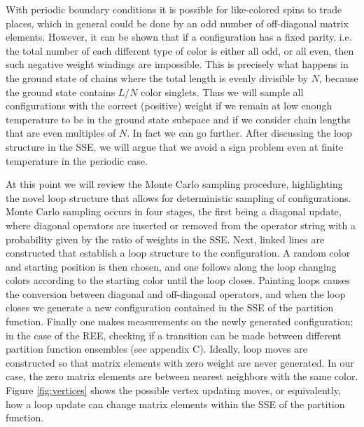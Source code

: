 \documentclass[aps,prb,reprint,floatfix]{revtex4-1}
\begin{document}
With periodic boundary conditions it is possible for like-colored spins to trade places, which in general could be done by an odd number of off-diagonal matrix elements.  However, it can be shown that if a configuration has a fixed parity, i.e. the total number of each different type of color is either all odd, or all even, then such negative weight windings are impossible.  This is precisely what happens in the ground state of chains where the total length is evenly divisible by $N$, because the ground state contains $L/N$ color singlets.  Thus we will sample all configurations with the correct (positive) weight if we remain at low enough temperature to be in the ground state subspace and if we consider chain lengths that are even multiples of $N$.  In fact we can go further.  After discussing the loop structure in the SSE, we will argue that we avoid a sign problem even at finite temperature in the periodic case.  

At this point we will review the Monte Carlo sampling procedure, highlighting the novel loop structure that allows for deterministic sampling of configurations.  Monte Carlo sampling occurs in four stages, the first being a diagonal update, where diagonal operators are inserted or removed from the operator string with a probability given by the ratio of weights in the SSE.  Next, linked lines are constructed that establish a loop structure to the configuration.  A random color and starting position is then chosen, and one follows along the loop changing colors according to the starting color until the loop closes.  Painting loops causes the conversion between diagonal and off-diagonal operators, and when the loop closes we generate a new configuration contained in the SSE of the partition function.  Finally one makes measurements on the newly generated configuration; in the case of the REE, checking if a transition can be made between different partition function ensembles (see appendix C).  Ideally, loop moves are constructed so that matrix elements with zero weight are never generated.  In our case, the zero matrix elements are between nearest neighbors with the same color.  Figure \ref{fig:vertices} shows the possible vertex updating moves, or equivalently, how a loop update can change matrix elements within the SSE of the partition function.
  
\end{document}
